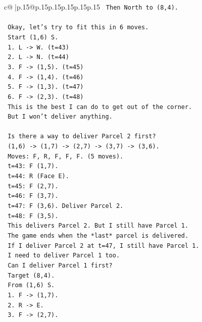 \documentclass{article}
\begin{document}
{\begin{supertabular}{c@{$\;$}|p{.15\linewidth}@{}p{.15\linewidth}p{.15\linewidth}p{.15\linewidth}p{.15\linewidth}p{.15\linewidth}}
{{{\texttt{      Then North to (8,4).} \\
\\ 
\texttt{      Okay, let's try to fit this in 6 moves.} \\
\texttt{      Start (1,6) S.} \\
\texttt{      1. L {-}> W. (t=43)} \\
\texttt{      2. L {-}> N. (t=44)} \\
\texttt{      3. F {-}> (1,5). (t=45)} \\
\texttt{      4. F {-}> (1,4). (t=46)} \\
\texttt{      5. F {-}> (1,3). (t=47)} \\
\texttt{      6. F {-}> (2,3). (t=48)} \\
\texttt{      This is the best I can do to get out of the corner.} \\
\texttt{      But I won't deliver anything.} \\
\\ 
\texttt{      Is there a way to deliver Parcel 2 first?} \\
\texttt{      (1,6) {-}> (1,7) {-}> (2,7) {-}> (3,7) {-}> (3,6).} \\
\texttt{      Moves: F, R, F, F, F. (5 moves).} \\
\texttt{      t=43: F (1,7).} \\
\texttt{      t=44: R (Face E).} \\
\texttt{      t=45: F (2,7).} \\
\texttt{      t=46: F (3,7).} \\
\texttt{      t=47: F (3,6). Deliver Parcel 2.} \\
\texttt{      t=48: F (3,5).} \\
\texttt{      This delivers Parcel 2. But I still have Parcel 1.} \\
\texttt{      The game ends when the *last* parcel is delivered.} \\
\texttt{      If I deliver Parcel 2 at t=47, I still have Parcel 1.} \\
\texttt{      I need to deliver Parcel 1 too.} \\
\texttt{      Can I deliver Parcel 1 first?} \\
\texttt{      Target (8,4).} \\
\texttt{      From (1,6) S.} \\
\texttt{      1. F {-}> (1,7).} \\
\texttt{      2. R {-}> E.} \\
\texttt{      3. F {-}> (2,7).} \\
}}}
\end{supertabular}}
\end{document}
